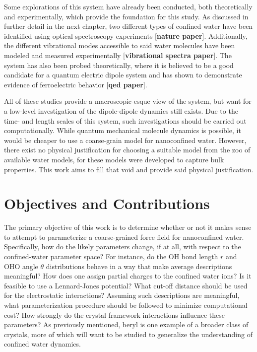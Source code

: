 Some explorations of this system have already been conducted, both theoretically and experimentally, which provide the foundation for this study. As discussed in further detail in the next chapter, two different types of confined water have been identified using optical spectroscopy experiments [\textbf{nature paper}]. Additionally, the different vibrational modes accessible to said water molecules have been modeled and measured experimentally [\textbf{vibrational spectra paper}]. The system has also been probed theoretically, where it is believed to be a good candidate for a quantum electric dipole system and has shown to demonstrate evidence of ferroelectric behavior [\textbf{qed paper}]. 

All of these studies provide a macroscopic-esque view of the system, but want for a low-level investigation of the dipole-dipole dynamics still exists. Due to the time- and length scales of this system, such investigations should be carried out computationally. While quantum mechanical molecule dynamics is possible, it would be cheaper to use a coarse-grain model for nanoconfined water. However, there exist no physical justification for choosing a suitable model from the zoo of available water models, for these models were developed to capture bulk properties. This work aims to fill that void and provide said physical justification. 

\section{Objectives and Contributions}
\label{objectives}

The primary objective of this work is to determine whether or not it makes sense to attempt to parameterize a coarse-grained force field for nanoconfined water. Specifically, how do the likely parameters change, if at all, with respect to the confined-water parameter space? For instance, do the OH bond length $r$ and OHO angle $\theta$ distributions behave in a way that make average descriptions meaningful? How does one assign partial charges to the confined water ions? Is it feasible to use a Lennard-Jones potential? What cut-off distance should be used for the electrostatic interactions? Assuming such descriptions are meaningful, what parameterization procedure should be followed to minimize computational cost? How strongly do the crystal framework interactions influence these parameters? As previously mentioned, beryl is one example of a broader class of crystals, more of which will want to be studied to generalize the understanding of confined water dynamics.

